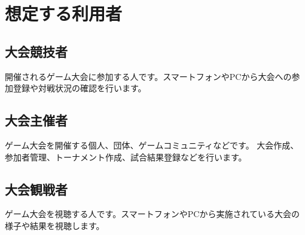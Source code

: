 \section{想定する利用者}
\subsection{大会競技者}
開催されるゲーム大会に参加する人です。スマートフォンやPCから大会への参加登録や対戦状況の確認を行います。

\subsection{大会主催者}
ゲーム大会を開催する個人、団体、ゲームコミュニティなどです。
大会作成、参加者管理、トーナメント作成、試合結果登録などを行います。

\subsection{大会観戦者}
ゲーム大会を視聴する人です。スマートフォンやPCから実施されている大会の様子や結果を視聴します。
